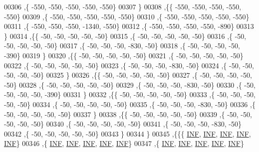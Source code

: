 \begin{DoxyCode}
00306   ,\{  -550,  -550,  -550,  -550,  -550\}
00307   \}
00308  ,\{\{  -550,  -550,  -550,  -550,  -550\}
00309   ,\{  -550,  -550,  -550,  -550,  -550\}
00310   ,\{  -550,  -550,  -550,  -550,  -550\}
00311   ,\{  -550,  -550,  -550, -1340,  -550\}
00312   ,\{  -550,  -550,  -550,  -550,  -890\}
00313   \}
00314  ,\{\{   -50,   -50,   -50,   -50,   -50\}
00315   ,\{   -50,   -50,   -50,   -50,   -50\}
00316   ,\{   -50,   -50,   -50,   -50,   -50\}
00317   ,\{   -50,   -50,   -50,  -830,   -50\}
00318   ,\{   -50,   -50,   -50,   -50,  -390\}
00319   \}
00320  ,\{\{   -50,   -50,   -50,   -50,   -50\}
00321   ,\{   -50,   -50,   -50,   -50,   -50\}
00322   ,\{   -50,   -50,   -50,   -50,   -50\}
00323   ,\{   -50,   -50,   -50,  -830,   -50\}
00324   ,\{   -50,   -50,   -50,   -50,   -50\}
00325   \}
00326  ,\{\{   -50,   -50,   -50,   -50,   -50\}
00327   ,\{   -50,   -50,   -50,   -50,   -50\}
00328   ,\{   -50,   -50,   -50,   -50,   -50\}
00329   ,\{   -50,   -50,   -50,  -830,   -50\}
00330   ,\{   -50,   -50,   -50,   -50,  -390\}
00331   \}
00332  ,\{\{   -50,   -50,   -50,   -50,   -50\}
00333   ,\{   -50,   -50,   -50,   -50,   -50\}
00334   ,\{   -50,   -50,   -50,   -50,   -50\}
00335   ,\{   -50,   -50,   -50,  -830,   -50\}
00336   ,\{   -50,   -50,   -50,   -50,   -50\}
00337   \}
00338  ,\{\{   -50,   -50,   -50,   -50,   -50\}
00339   ,\{   -50,   -50,   -50,   -50,   -50\}
00340   ,\{   -50,   -50,   -50,   -50,   -50\}
00341   ,\{   -50,   -50,   -50,  -830,   -50\}
00342   ,\{   -50,   -50,   -50,   -50,   -50\}
00343   \}
00344  \}
00345 ,\{\{\{   \mbox{\hyperlink{1_88_84__epars_8h_a12c2040f25d8e3a7b9e1c2024c618cb6}{INF}},   \mbox{\hyperlink{1_88_84__epars_8h_a12c2040f25d8e3a7b9e1c2024c618cb6}{INF}},   \mbox{\hyperlink{1_88_84__epars_8h_a12c2040f25d8e3a7b9e1c2024c618cb6}{INF}},   \mbox{\hyperlink{1_88_84__epars_8h_a12c2040f25d8e3a7b9e1c2024c618cb6}{INF}},   \mbox{\hyperlink{1_88_84__epars_8h_a12c2040f25d8e3a7b9e1c2024c618cb6}{INF}}\}
00346   ,\{   \mbox{\hyperlink{1_88_84__epars_8h_a12c2040f25d8e3a7b9e1c2024c618cb6}{INF}},   \mbox{\hyperlink{1_88_84__epars_8h_a12c2040f25d8e3a7b9e1c2024c618cb6}{INF}},   \mbox{\hyperlink{1_88_84__epars_8h_a12c2040f25d8e3a7b9e1c2024c618cb6}{INF}},   \mbox{\hyperlink{1_88_84__epars_8h_a12c2040f25d8e3a7b9e1c2024c618cb6}{INF}},   \mbox{\hyperlink{1_88_84__epars_8h_a12c2040f25d8e3a7b9e1c2024c618cb6}{INF}}\}
00347   ,\{   \mbox{\hyperlink{1_88_84__epars_8h_a12c2040f25d8e3a7b9e1c2024c618cb6}{INF}},   \mbox{\hyperlink{1_88_84__epars_8h_a12c2040f25d8e3a7b9e1c2024c618cb6}{INF}},   \mbox{\hyperlink{1_88_84__epars_8h_a12c2040f25d8e3a7b9e1c2024c618cb6}{INF}},   \mbox{\hyperlink{1_88_84__epars_8h_a12c2040f25d8e3a7b9e1c2024c618cb6}{INF}},   \mbox{\hyperlink{1_88_84__epars_8h_a12c2040f25d8e3a7b9e1c2024c618cb6}{INF}}\}

\end{DoxyCode}
